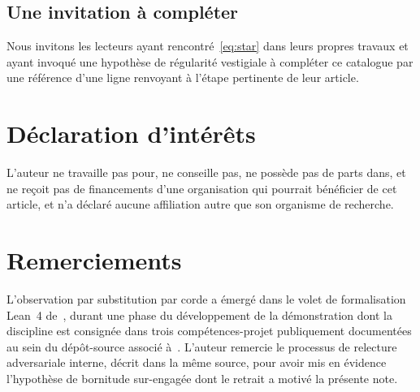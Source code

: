\documentclass[11pt,a4paper]{amsart}
\begin{document}
\subsection{Une invitation à compléter}
\label{ssec:invitation}

Nous invitons les lecteurs ayant rencontré~\eqref{eq:star} dans leurs
propres travaux et ayant invoqué une hypothèse de régularité vestigiale à
compléter ce catalogue par une référence d'une ligne renvoyant à l'étape
pertinente de leur article.

\section*{Déclaration d'intérêts}

L'auteur ne travaille pas pour, ne conseille pas, ne possède pas de parts
dans, et ne reçoit pas de financements d'une organisation qui pourrait
bénéficier de cet article, et n'a déclaré aucune affiliation autre que son
organisme de recherche.

\section*{Remerciements}

L'observation par substitution par corde a émergé dans le volet de
formalisation Lean~4 de~\cite{El2}, durant une phase du développement de
la démonstration dont la discipline est consignée dans trois
compétences-projet publiquement documentées au sein du dépôt-source
associé à~\cite{El2}. L'auteur remercie le processus de relecture
adversariale interne, décrit dans la même source, pour avoir mis en
évidence l'hypothèse de bornitude sur-engagée dont le retrait a motivé la
présente note.



\end{document}
